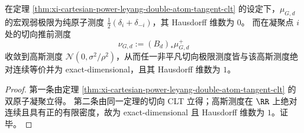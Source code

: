 \begin{corollary}\label{cor:xi-leyang-tangent-dimension-resurrection}
在定理 \ref{thm:xi-cartesian-power-leyang-double-atom-tangent-clt} 的设定下，\(\mu_{G,d}\) 的宏观弱极限为纯原子测度 \(\tfrac12(\delta_i+\delta_{-i})\)，其 Hausdorff 维数为 \(0\)。
而在凝聚点 \(i\) 处的切向推前测度
\[
\nu_{G,d}:=(B_d)_*\mu_{G,d}^{+}
\]
收敛到高斯测度 \(\mathcal N(0,\sigma^2/\rho^2)\)，从而任一非平凡切向极限测度皆与该高斯测度绝对连续等价并为 exact-dimensional，且其 Hausdorff 维数为 \(1\)。
\end{corollary}

\begin{proof}
第一条由定理 \ref{thm:xi-cartesian-power-leyang-double-atom-tangent-clt} 的双原子凝聚立得。
第二条由同一定理的切向 CLT 立得；高斯测度在 \(\RR\) 上绝对连续且具有正的有限密度，故为 exact-dimensional 且 Hausdorff 维数为 \(1\)。证毕。
\end{proof}
